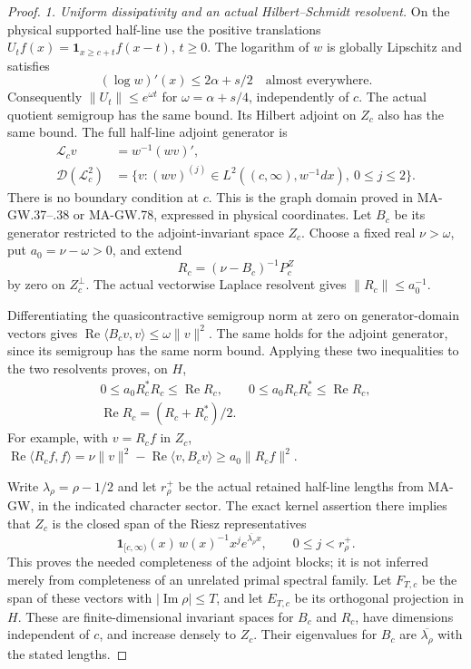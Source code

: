 \begin{proof}
\emph{1. Uniform dissipativity and an actual Hilbert--Schmidt resolvent.}
On the physical supported half-line use the positive translations
$U_tf(x)=\mathbf1_{x\ge c+t}f(x-t)$, $t\ge0$.
The logarithm of $w$ is globally Lipschitz and satisfies
\[
 (\log w)'(x)\le2\alpha+s/2\quad\text{almost everywhere}.
\]
Consequently $\|U_t\|\le e^{\omega t}$ for
$\omega=\alpha+s/4$, independently of $c$.
The actual quotient semigroup has the same bound.
Its Hilbert adjoint on $Z_c$ also has the same bound.
The full half-line adjoint generator is
\[
 \begin{aligned}
 \mathcal L_cv&=w^{-1}(wv)',\\
 \mathcal D(\mathcal L_c^2)
   &=\{v:(wv)^{(j)}\in L^2((c,\infty),w^{-1}dx),\ 0\le j\le2\}.
 \end{aligned}
 \tag{MA-NZ.4}
\]
There is no boundary condition at $c$.
This is the graph domain proved in MA-GW.37--.38 or
MA-GW.78, expressed in physical coordinates.
Let $B_c$ be its generator restricted to the adjoint-invariant
space $Z_c$.  Choose a fixed real $\nu>\omega$, put
$a_0=\nu-\omega>0$, and extend
\[
                   R_c=(\nu-B_c)^{-1}P_c^Z
 \tag{MA-NZ.5}
\]
by zero on $Z_c^\perp$.
The actual vectorwise Laplace resolvent gives
$\|R_c\|\le a_0^{-1}$.

Differentiating the quasicontractive semigroup norm at zero
on generator-domain vectors gives
$\operatorname{Re}\langle B_cv,v\rangle\le\omega\|v\|^2$.
The same holds for the adjoint generator, since its semigroup
has the same norm bound.  Applying these two inequalities
to the two resolvents proves, on $H$,
\[
 \begin{gathered}
 0\le a_0R_c^*R_c\le\operatorname{Re}R_c,
 \qquad 0\le a_0R_cR_c^*\le\operatorname{Re}R_c,\\
 \operatorname{Re}R_c=(R_c+R_c^*)/2.
 \end{gathered}
 \tag{MA-NZ.6}
\]
For example, with $v=R_cf$ in $Z_c$,
$\operatorname{Re}\langle R_cf,f\rangle
 =\nu\|v\|^2-\operatorname{Re}\langle v,B_cv\rangle
 \ge a_0\|R_cf\|^2$.

Write $\lambda_\rho=\rho-1/2$ and let $r_\rho^+$ be the
actual retained half-line lengths from MA-GW, in the indicated
character sector.  The exact kernel assertion there implies
that $Z_c$ is the closed span of the Riesz representatives
\[
  \mathbf1_{[c,\infty)}(x)\,w(x)^{-1}x^j
             e^{\overline{\lambda_\rho}x},
                     \qquad 0\le j<r_\rho^+.
 \tag{MA-NZ.7}
\]
This proves the needed completeness of the adjoint blocks;
it is not inferred merely from completeness of an unrelated
primal spectral family.
Let $F_{T,c}$ be the span of these vectors with
$|\operatorname{Im}\rho|\le T$, and let $E_{T,c}$ be its
orthogonal projection in $H$.
These are finite-dimensional invariant spaces for $B_c$
and $R_c$, have dimensions independent of $c$, and increase
densely to $Z_c$.
Their eigenvalues for $B_c$ are
$\overline{\lambda_\rho}$ with the stated lengths.


\end{proof}
